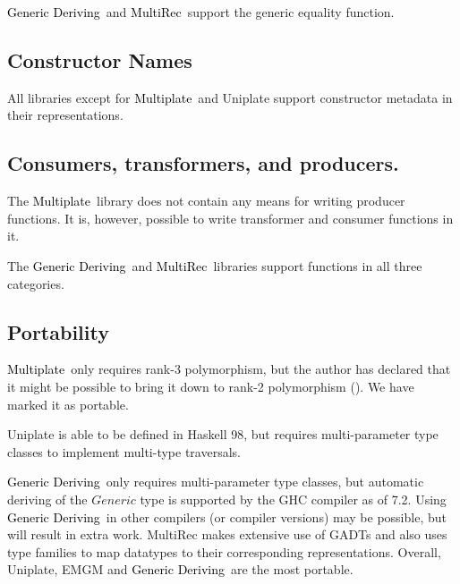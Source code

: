 \documentclass[twocolumn,11pt,a4paper]{article}
\newcommand{\multiplate}{\textcolor{black}{Multiplate}}
\newcommand{\genericderiving}{\textcolor{black}{Generic Deriving}}
\newcommand{\multirec}{\textcolor{black}{MultiRec}}
\begin{document}
\genericderiving\ and \multirec\ support the generic equality function.

\subsection{Constructor Names}
All libraries except for \multiplate\ and Uniplate support constructor metadata in their representations.

\subsection{Consumers, transformers, and producers.}
The \multiplate\ library does not contain any means for writing producer functions.
It is, however, possible to write transformer and consumer functions in it.

The \genericderiving\ and \multirec\ libraries support functions in all three categories.

\subsection{Portability}
\multiplate\ only requires rank-3 polymorphism, but the author has declared that it might be possible to bring it down to rank-2 polymorphism (\citet{multiplate:2011:lib}).
We have marked it as portable.

Uniplate is able to be defined in Haskell 98, but requires multi-parameter type classes to implement multi-type traversals.

\genericderiving\ only requires multi-parameter type classes, but automatic deriving of the $ Generic $ type is supported by the GHC compiler as of 7.2.
Using \genericderiving\ in other compilers (or compiler versions) may be possible, but will result in extra work.
MultiRec makes extensive use of GADTs and also uses type families to map datatypes to their corresponding representations.
Overall, Uniplate, EMGM and \genericderiving\ are the most portable.
\end{document}
